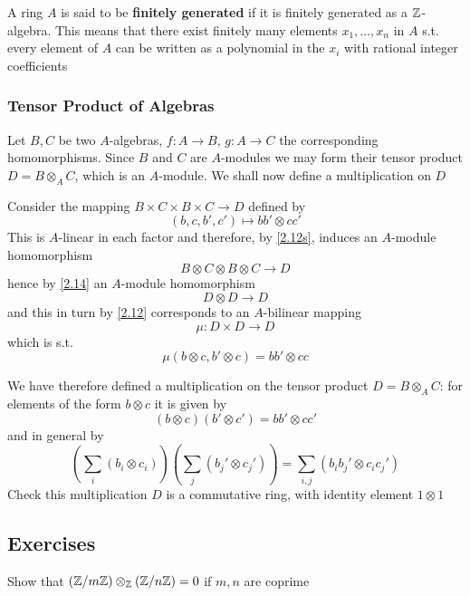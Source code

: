\documentclass[11pt]{article}
\begin{document}
A ring \(A\) is said to be \textbf{finitely generated} if it is finitely generated as a \(\mathbb{Z}\)-algebra.
This means that there exist finitely many elements \(x_1,\dots,x_n\) in \(A\) s.t. every element
of \(A\) can be written as a polynomial in the \(x_i\) with rational integer coefficients
\subsubsection*{Tensor Product of Algebras}
\label{sec:org1110920}
Let \(B,C\) be two \(A\)-algebras, \(f:A\to B\), \(g:A\to C\) the corresponding homomorphisms.
Since \(B\) and \(C\) are \(A\)-modules we may form their tensor product \(D=B\otimes_AC\), which is
an \(A\)-module. We shall now define a multiplication on \(D\)

Consider the mapping \(B\times C\times B\times C\to D\) defined by
\begin{equation*}
(b,c,b',c')\mapsto bb'\otimes cc'
\end{equation*}
This is \(A\)-linear in each factor and therefore, by \ref{2.12s}, induces an \(A\)-module
homomorphism
\begin{equation*}
B\otimes C\otimes B\otimes C\to D
\end{equation*}
hence by \ref{2.14} an \(A\)-module homomorphism
\begin{equation*}
D\otimes D\to D
\end{equation*}
and this in turn by \ref{2.12} corresponds to an \(A\)-bilinear mapping
\begin{equation*}
\mu:D\times D\to D
\end{equation*}
which is s.t.
\begin{equation*}
\mu(b\otimes c,b'\otimes c)=bb'\otimes cc
\end{equation*}

We have therefore defined a multiplication on the tensor product \(D=B\otimes_AC\): for elements of
the form \(b\otimes c\) it is given by
\begin{equation*}
(b\otimes c)(b'\otimes c')=bb'\otimes cc'
\end{equation*}
and in general by
\begin{equation*}
\left( \sum_i(b_i\otimes c_i) \right)\left( \sum_j(b_j'\otimes c_j') \right)=\sum_{i,j}(b_ib_j'\otimes c_ic_j')
\end{equation*}
Check this multiplication \(D\) is a commutative ring, with identity element \(1\otimes 1\)
\subsection{Exercises}
\label{sec:orgb27d1a2}
\begin{exercise}
\label{ex2.1}
Show that \((\mathbb{Z}/m\mathbb{Z})\otimes_{\mathbb{Z}}(\mathbb{Z}/n\mathbb{Z})=0\) if \(m,n\) are coprime
\end{exercise}
\end{document}
